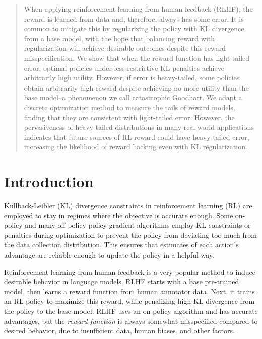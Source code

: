 \documentclass{article}
\theoremstyle{plain}
\theoremstyle{definition}
\theoremstyle{remark}
\begin{document}
\begin{abstract}
  When applying reinforcement learning from human feedback (RLHF), the reward is learned from data and, therefore, always has some error. It is common to mitigate this by regularizing the policy with KL divergence from a base model, with the hope that balancing reward with regularization will achieve desirable outcomes despite this reward misspecification. We show that when the reward function has light-tailed error, optimal policies under less restrictive KL penalties achieve arbitrarily high utility. However, if error is heavy-tailed, some policies obtain arbitrarily high reward despite achieving no more utility than the base model--a phenomenon we call catastrophic Goodhart. We adapt a discrete optimization method to measure the tails of reward models, finding that they are consistent with light-tailed error. However, the pervasiveness of heavy-tailed distributions in many real-world applications indicates that future sources of RL reward could have heavy-tailed error, increasing the likelihood of reward hacking even with KL regularization.
\end{abstract}

\section{Introduction}

Kullback-Leibler (KL) divergence constraints in reinforcement learning (RL) are employed to stay in regimes where the objective is accurate enough.
Some on-policy \citep{trpo,ppo} and many off-policy \citep{abdolmaleki18mpo,jaques2019way} policy gradient algorithms employ KL constraints or penalties during optimization to prevent the policy from deviating too much from the data collection distribution. This ensures that estimates of each action's advantage are reliable enough to update the policy in a helpful way.

Reinforcement learning from human feedback \citep[RLHF]{rlhf_christiano,ziegler2020finetuning} is a very popular method to induce desirable behavior in language models. RLHF starts with a base pre-trained model, then learns a reward function from human annotator data. Next, it trains an RL policy to maximize this reward, while penalizing high KL divergence from the policy to the base model. RLHF uses an on-policy algorithm and has accurate advantages, but the \emph{reward function} is always somewhat misspecified compared to desired behavior, due to insufficient data, human biases, and other factors.
\end{document}
